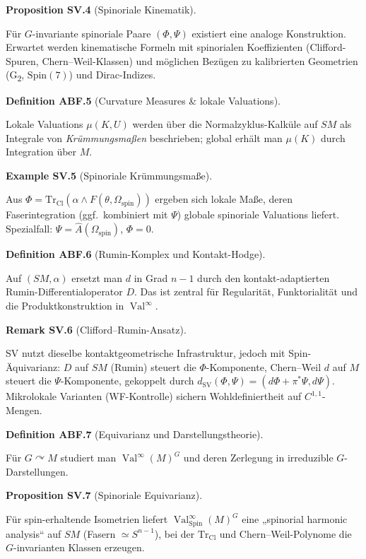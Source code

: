 \documentclass[10pt, letterpaper]{article}
\newcommand{\Spin}{\mathrm{Spin}}
\newcommand{\CustomHeading}[3]{%
  \par\medskip\noindent%
  \textbf{#1 #2} \textnormal{(#3)}.\enskip%
}
\newenvironment{DEF}[2]{\begin{unitbox}\CustomHeading{Definition}{#1}{#2}}{\end{unitbox}}
\newenvironment{PROP}[2]{\begin{unitbox}\CustomHeading{Proposition}{#1}{#2}}{\end{unitbox}}
\newenvironment{REM}[2]{\begin{unitbox}\CustomHeading{Remark}{#1}{#2}}{\end{unitbox}}
\newenvironment{EXA}[2]{\begin{unitbox}\CustomHeading{Example}{#1}{#2}}{\end{unitbox}}
\begin{document}
\begin{PROP}{SV.4}{Spinoriale Kinematik}
Für $G$-invariante spinoriale Paare $(\Phi,\Psi)$ existiert eine analoge Konstruktion.
Erwartet werden kinematische Formeln mit spinorialen Koeffizienten (Clifford-Spuren, Chern–Weil-Klassen)
und möglichen Bezügen zu kalibrierten Geometrien (G\textsubscript{2}, $\Spin(7)$) und Dirac-Indizes.
\end{PROP}


\begin{DEF}{ABF.5}{Curvature Measures \& lokale Valuations}
Lokale Valuations $\mu(K,U)$ werden über die Normalzyklus-Kalküle auf $SM$
als Integrale von \emph{Krümmungsmaßen} beschrieben; global erhält man $\mu(K)$ durch Integration über $M$.
\end{DEF}

\begin{EXA}{SV.5}{Spinoriale Krümmungsmaße}
Aus $\Phi=\mathrm{Tr}_{\mathrm{Cl}}(\alpha\wedge F(\theta,\Omega_{\mathrm{spin}}))$ ergeben sich lokale Maße,
deren Faserintegration (ggf.\ kombiniert mit $\Psi$) globale spinoriale Valuations liefert.
Spezialfall: $\Psi=\widehat A(\Omega_{\mathrm{spin}})$, $\Phi=0$.
\end{EXA}


\begin{DEF}{ABF.6}{Rumin-Komplex und Kontakt-Hodge}
Auf $(SM,\alpha)$ ersetzt man $d$ in Grad $n{-}1$ durch den kontakt-adaptierten Rumin-Differentialoperator $D$.
Das ist zentral für Regularität, Funktorialität und die Produktkonstruktion in $\operatorname{Val}^\infty$.
\end{DEF}

\begin{REM}{SV.6}{Clifford–Rumin-Ansatz}
SV nutzt dieselbe kontaktgeometrische Infrastruktur, jedoch mit Spin-Äquivarianz:
$D$ auf $SM$ (Rumin) steuert die $\Phi$-Komponente, Chern–Weil $d$ auf $M$ steuert die $\Psi$-Komponente,
gekoppelt durch $d_{\mathrm{SV}}(\Phi,\Psi)=(d\Phi+\pi^*\Psi,d\Psi)$.
Mikrolokale Varianten (WF-Kontrolle) sichern Wohldefiniertheit auf $C^{1,1}$-Mengen.
\end{REM}


\begin{DEF}{ABF.7}{Equivarianz und Darstellungstheorie}
Für $G\curvearrowright M$ studiert man $\operatorname{Val}^\infty(M)^G$ und deren Zerlegung in irreduzible $G$-Darstellungen.
\end{DEF}

\begin{PROP}{SV.7}{Spinoriale Equivarianz}
Für spin-erhaltende Isometrien liefert $\operatorname{Val}^\infty_{\Spin}(M)^G$
eine „spinorial harmonic analysis“ auf $SM$ (Fasern $\simeq S^{n-1}$),
bei der $\mathrm{Tr}_{\mathrm{Cl}}$ und Chern–Weil-Polynome die $G$-invarianten Klassen erzeugen.
\end{PROP}
\end{document}
